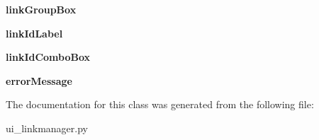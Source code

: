 \begin{DoxyCompactItemize}
\item 
\hypertarget{class_sim_g_d_c_1_1ui__linkmanager_1_1_ui___link_manager_a7431b76749612b5f52261cc78baa362f}{}{\bfseries link\+Group\+Box}\label{class_sim_g_d_c_1_1ui__linkmanager_1_1_ui___link_manager_a7431b76749612b5f52261cc78baa362f}

\item 
\hypertarget{class_sim_g_d_c_1_1ui__linkmanager_1_1_ui___link_manager_a7cc7ce9ceef240be107d88c60f7ce120}{}{\bfseries link\+Id\+Label}\label{class_sim_g_d_c_1_1ui__linkmanager_1_1_ui___link_manager_a7cc7ce9ceef240be107d88c60f7ce120}

\item 
\hypertarget{class_sim_g_d_c_1_1ui__linkmanager_1_1_ui___link_manager_aec0ba87d5f626dc177ff26a7c33f505f}{}{\bfseries link\+Id\+Combo\+Box}\label{class_sim_g_d_c_1_1ui__linkmanager_1_1_ui___link_manager_aec0ba87d5f626dc177ff26a7c33f505f}

\item 
\hypertarget{class_sim_g_d_c_1_1ui__linkmanager_1_1_ui___link_manager_a56c1a64d013ba9c5890889ff8c7b00bb}{}{\bfseries error\+Message}\label{class_sim_g_d_c_1_1ui__linkmanager_1_1_ui___link_manager_a56c1a64d013ba9c5890889ff8c7b00bb}

\end{DoxyCompactItemize}


The documentation for this class was generated from the following file\+:\begin{DoxyCompactItemize}
\item 
ui\+\_\+linkmanager.\+py\end{DoxyCompactItemize}
